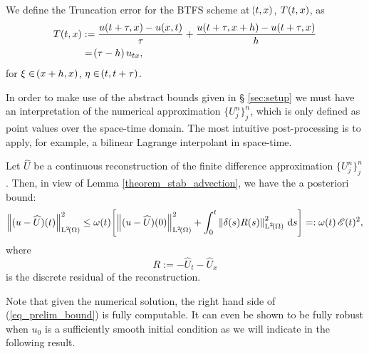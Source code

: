 \documentclass[final]{amsart}
\renewcommand{\d}{\ensuremath{\,\mathrm{d}}}
\numberwithin{equation}{section}
\begin{document}
\begin{Defn}\label{defn:btfs_truncation}
	We define the Truncation error for the BTFS scheme at $\!\left({t,x}\right)$, $T\!\left({t,x}\right)$, as
	\begin{equation}\label{eq:btfs_truncation}
	\begin{aligned}
	T\!\left({t,x}\right)&:=\frac{u\!\left({t+\tau,x}\right)-u\!\left({x,t}\right)}{\tau}+\frac{u\!\left({t+\tau,x+h}\right)-u\!\left({t+\tau,x}\right)}{h}\\
	&=\!\left({ \tau-h}\right)u_{tx},
	\end{aligned}
	\end{equation}
	for $\xi\in\!\left({x+h,x}\right)$, $\eta \in\!\left({t, t+\tau}\right)$.
\end{Defn}

In order to make use of the abstract bounds given in \S
\ref{sec:setup} we must have an interpretation of the numerical
approximation $\{ U^n_j \}_{j}^{n}$, which is only defined as point
values over the space-time domain. The most intuitive post-processing
is to apply, for example, a bilinear Lagrange interpolant in space-time. 

\begin{Cor}
	\label{cor:aposteriori}
	Let $\widehat U$ be a continuous reconstruction of the finite
	difference approximation $\{ U^n_j \}_{j}^n$. Then, in view of Lemma
	\ref{theorem_stab_advection}, we have the a posteriori bound:
	\begin{equation}\label{eq_prelim_bound}
	\Norm{(u - \widehat{U})\qp{t}}^2_{\leb{2}\qp{\W}}
	\leq
	\w(t)
	\qb{\Norm{(u - \widehat{U})\qp{0}}^2_{\leb{2}\qp{\W}}+\int_0^t\Norm{\delta(s) R(s)}^2_{\leb{2}\qp{\W}}  \d s }
	=: \w\qp{t}\cE(t)^2
	,
	\end{equation}
	where
	\begin{equation}\label{eq:residual_advection}
	R := - \widehat U_t - \widehat U_x
	\end{equation}
	is the discrete residual of the reconstruction.
\end{Cor}

Note that given the numerical solution, the right hand side of
(\ref{eq_prelim_bound}) is fully computable. It can even be shown to
be fully robust when $u_0$ is a sufficiently smooth initial condition
as we will indicate in the following result.
\end{document}

